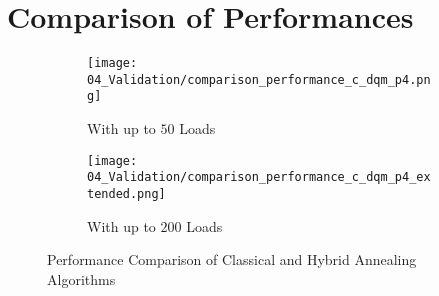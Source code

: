 \section{Comparison of Performances}
\label{validation:comparison}


\begin{figure}
  \begin{subfigure}[b]{0.5 \textwidth}
    \centering
    \texttt{[image: 04\_Validation/comparison\_performance\_c\_dqm\_p4.png]}
    \caption{With up to $50$ Loads}
    \label{figure:validation.performance.comparison}
  \end{subfigure}
  \begin{subfigure}[b]{0.5 \textwidth}
    \centering
    \texttt{[image: 04\_Validation/comparison\_performance\_c\_dqm\_p4\_extended.png]}
    \caption{With up to $200$ Loads}
    \label{figure:validation.comparison.performance.extended}
  \end{subfigure}
  \caption{Performance Comparison of Classical and Hybrid Annealing Algorithms}
\end{figure}
